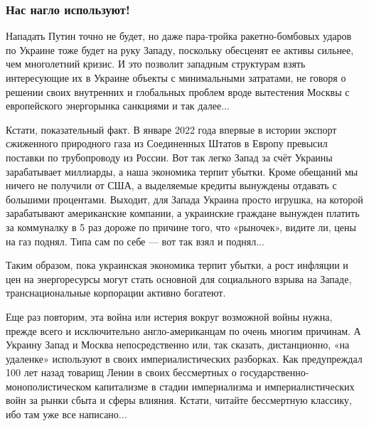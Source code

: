  
 
 
 
 

\subsubsection{Нас нагло используют!}

Нападать Путин точно не будет, но даже пара-тройка ракетно-бомбовых ударов по
Украине тоже будет на руку Западу, поскольку обесценят ее активы сильнее, чем
многолетний кризис. И это позволит западным структурам взять интересующие их в
Украине объекты с минимальными затратами, не говоря о решении своих внутренних
и глобальных проблем вроде вытестения Москвы с европейского энергорынка
санкциями и так далее...

Кстати, показательный факт. В январе 2022 года впервые в истории экспорт
сжиженного природного газа из Соединенных Штатов в Европу превысил поставки по
трубопроводу из России. Вот так легко Запад за счёт Украины зарабатывает
миллиарды, а наша экономика терпит убытки. Кроме обещаний мы ничего не получили
от США, а выделяемые кредиты вынуждены отдавать с большими процентами. Выходит,
для Запада Украина просто игрушка, на которой зарабатывают американские
компании, а украинские граждане вынужден платить за коммуналку в 5 раз дороже
по причине того, что «рыночек», видите ли, цены на газ поднял. Типа сам по себе
— вот так взял и поднял...

Таким образом, пока украинская экономика терпит убытки, а рост инфляции и цен
на энергоресурсы могут стать основной для социального взрыва на Западе,
транснациональные корпорации активно богатеют.

Еще раз повторим, эта война или истерия вокруг возможной войны нужна, прежде
всего и исключительно англо-американцам по очень многим причинам. А Украину
Запад и Москва непосредственно или, так сказать, дистанционно, «на удаленке»
используют в своих империалистических разборках. Как предупреждал 100 лет назад
товарищ Ленин в своих бессмертных о государственно-монополистическом
капитализме в стадии империализма и империалистических войн за рынки сбыта и
сферы влияния. Кстати, читайте бессмертную классику, ибо там уже все
написано...
